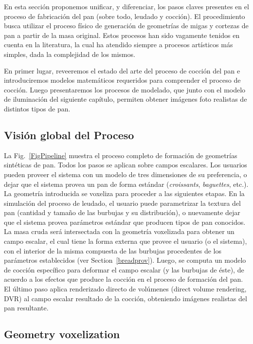 \documentclass[spanish,a4paper,11pt,oneside,links]{report}
\begin{document}
En esta sección proponemos unificar, y diferenciar, los pasos claves presentes en el proceso de fabricación del pan (sobre todo, leudado y cocción).
El procedimiento busca utilizar el proceso físico de generación de geometrías de migas y cortezas de pan a partir de la masa original.
Estos procesos han sido vagamente tenidos en cuenta en la literatura, la cual ha atendido siempre a procesos artísticos más simples, dada la complejidad de los mismos.

En primer lugar, reveeremos el estado del arte del proceso de cocción del pan e introduciremos modelos matemáticos requeridos para comprender el proceso de cocción.
Luego presentaremos los procesos de modelado, que junto con el modelo de iluminación del siguiente capítulo, permiten obtener imágenes foto realistas de distintos tipos de pan.

\subsection{Visión global del Proceso}
La Fig.~\ref{FigPipeline} muestra el proceso completo de formación de geometrías sintéticas de pan.
Todos los pasos se aplican sobre campos escalares.
Los usuarios pueden proveer el sistema con un modelo de tres dimensiones de su preferencia, o dejar que el sistema provea un pan de forma estándar ({\em croissants}, {\em baguettes}, etc.).
La geometría introducida se voxeliza para proceder a las siguientes etapas.
En la simulación del proceso de leudado, el usuario puede parametrizar la textura del pan (cantidad y tamaño de las burbujas y su distribución), o nuevamente dejar que el sistema provea parámetros estándar que producen tipos de pan conocidos.
La masa cruda será intersectada con la geometría voxelizada para obtener un campo escalar, el cual tiene la forma externa que provee el usuario (o el sistema), con el interior de la misma compuesta de las burbujas procedentes de los parámetros establecidos (ver Section~\ref{breadprov}).
Luego, se computa un modelo de cocción específico \cite{Powathil2004} para deformar el campo escalar (y las burbujas de éste), de acuerdo a los efectos que produce la cocción en el proceso de formación del pan.
El último paso aplica renderizado directo de volúmenes (direct volume rendering, DVR) \cite{Kruger2003} al campo escalar resultado de la cocción, obteniendo imágenes realistas del pan resultante.


\subsection{Geometry voxelization}
\end{document}
